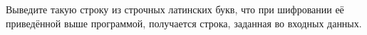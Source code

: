 Выведите такую строку из строчных латинских букв, что при шифровании её приведённой выше программой, получается строка, заданная во входных данных.